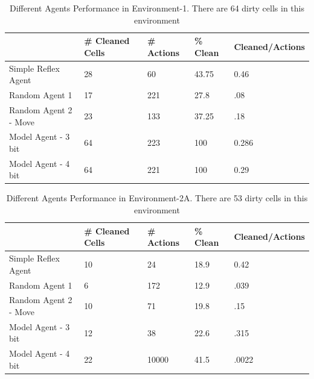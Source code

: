 \documentclass{article}
\begin{document}
\begin{table}[h!]
\centering
\caption{Different Agents Performance in Environment-1. There are 64 dirty cells in this environment}
\label{my-label}
\begin{tabular}{l|ll|ll}
\hline
                    & \# Cleaned Cells & \# Actions  & \% Clean & Cleaned/Actions \\ \hline
Simple Reflex Agent 		& 28                  & 60                  & 43.75     & 0.46            \\ \hline
Random Agent 1       	& 17          	& 221                & 27.8       & .08            \\ 
Random Agent 2 - Move 	& 23 			& 133		&37.25	& .18			\\ \hline
Model Agent - 3 bit		& 64                  & 223                & 100       & 0.286            \\
Model Agent - 4 bit		& 64                  & 221                & 100       & 0.29            \\ \hline
\end{tabular}
\end{table}




\begin{table}[h!]
\centering
\caption{Different Agents Performance in Environment-2A. There are 53 dirty cells in this environment}
\label{my-label}
\begin{tabular}{l|ll|ll}
\hline
                    & \# Cleaned Cells & \# Actions  & \% Clean & Cleaned/Actions \\ \hline
Simple Reflex Agent 		& 10                  & 24                  & 18.9     & 0.42            \\ \hline
Random Agent 1       	& 6	         	& 172                & 12.9       & .039            \\ 
Random Agent 2 - Move 	& 10 			& 71		& 19.8	& .15			\\ \hline
Model Agent - 3 bit		& 12                  & 38                & 22.6       & .315            \\ 
Model Agent - 4 bit		& 22                  & 10000                & 41.5       & .0022            \\ 
\end{tabular}
\end{table}
\end{document}
